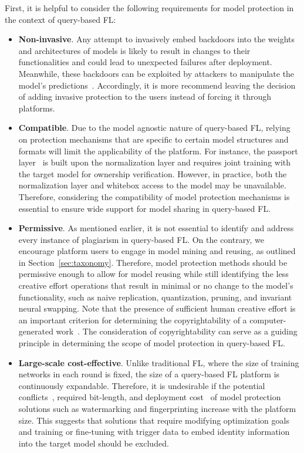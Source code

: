 First, it is helpful to consider the following requirements for model protection in the context of query-based FL:
\begin{itemize}
  \item \textbf{Non-invasive}. Any attempt to invasively embed backdoors into the weights and architectures of models is likely to result in changes to their functionalities and could lead to unexpected failures after deployment. 
  Meanwhile, these backdoors can be exploited by attackers to manipulate the model's predictions~\cite{li2022untargeted}.
  Accordingly, it is more recommend leaving the decision of adding invasive protection to the users instead of forcing it through platforms.
  
  \item \textbf{Compatible}. %
  Due to the model agnostic nature of query-based FL, relying on protection mechanisms that are specific to certain model structures and formats will limit the applicability of the platform.
  For instance, the passport layer~\cite{zhang2020passport} is built upon the normalization layer and requires joint training with the target model for ownership verification.
  However, in practice, both the normalization layer and whitebox access to the model may be unavailable.
  Therefore, considering the compatibility of model protection mechanisms is essential to ensure wide support for model sharing in query-based FL.

  \item \textbf{Permissive}. %
  As mentioned earlier, it is not essential to identify and address every instance of plagiarism in query-based FL. 
  On the contrary, we encourage platform users to engage in model mining and reusing, as outlined in Section~\ref{sec:taxonomy}. 
  Therefore, model protection methods should be permissive enough to allow for model reusing while still identifying the less creative effort operations that result in minimal or no change to the model's functionality, such as naive replication, quantization, pruning, and invariant neural swapping.
  Note that the presence of sufficient human creative effort is an important criterion for determining the copyrightability of a computer-generated work~\cite{national1979final}.
  The consideration of copyrightability can serve as a guiding principle in determining the scope of model protection in query-based FL.

  \item \textbf{Large-scale cost-effective}.
  Unlike traditional FL, where the size of training networks in each round is fixed, the size of a query-based FL platform is continuously expandable. 
  Therefore, it is undesirable if the potential conflicts~\cite{li2023fedipr}, required bit-length, and deployment cost~\cite{uchida2017embedding, darvish2019deepsigns} of model protection solutions such as watermarking and fingerprinting increase with the platform size.
  This suggests that solutions that require modifying optimization goals and training or fine-tuning with trigger data to embed identity information into the target model should be excluded.

\end{itemize}

